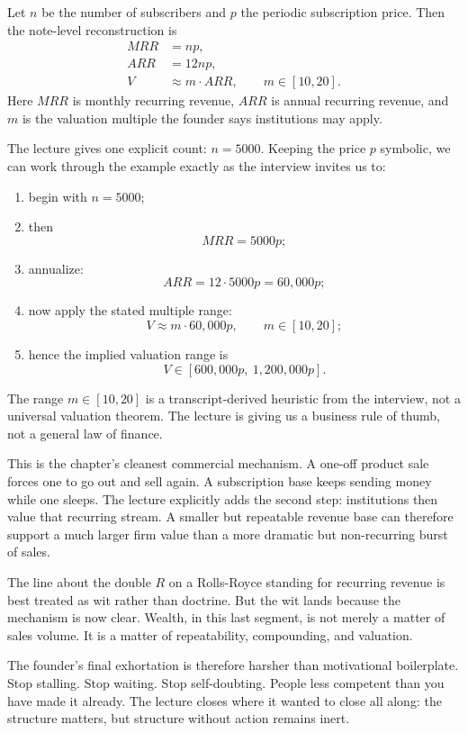 Let \(n\) be the number of subscribers and \(p\) the periodic subscription price. Then the note-level reconstruction is
\begin{align}
MRR &= np,\\
ARR &= 12np,\\
V &\approx m \cdot ARR, \qquad m \in [10,20].
\end{align}
Here \(MRR\) is monthly recurring revenue, \(ARR\) is annual recurring revenue, and \(m\) is the valuation multiple the founder says institutions may apply.

The lecture gives one explicit count: \(n=5000\). Keeping the price \(p\) symbolic, we can work through the example exactly as the interview invites us to:
\begin{enumerate}
\item begin with \(n=5000\);
\item then
\[
MRR = 5000p;
\]
\item annualize:
\[
ARR = 12 \cdot 5000p = 60{,}000p;
\]
\item now apply the stated multiple range:
\[
V \approx m \cdot 60{,}000p, \qquad m \in [10,20];
\]
\item hence the implied valuation range is
\[
V \in [600{,}000p,\ 1{,}200{,}000p].
\]
\end{enumerate}

\begin{remark}
The range \(m \in [10,20]\) is a transcript-derived heuristic from the interview, not a universal valuation theorem. The lecture is giving us a business rule of thumb, not a general law of finance.
\end{remark}

This is the chapter's cleanest commercial mechanism. A one-off product sale forces one to go out and sell again. A subscription base keeps sending money while one sleeps. The lecture explicitly adds the second step: institutions then value that recurring stream. A smaller but repeatable revenue base can therefore support a much larger firm value than a more dramatic but non-recurring burst of sales.

The line about the double \(R\) on a Rolls-Royce standing for recurring revenue is best treated as wit rather than doctrine. But the wit lands because the mechanism is now clear. Wealth, in this last segment, is not merely a matter of sales volume. It is a matter of repeatability, compounding, and valuation.

The founder's final exhortation is therefore harsher than motivational boilerplate. Stop stalling. Stop waiting. Stop self-doubting. People less competent than you have made it already. The lecture closes where it wanted to close all along: the structure matters, but structure without action remains inert.

